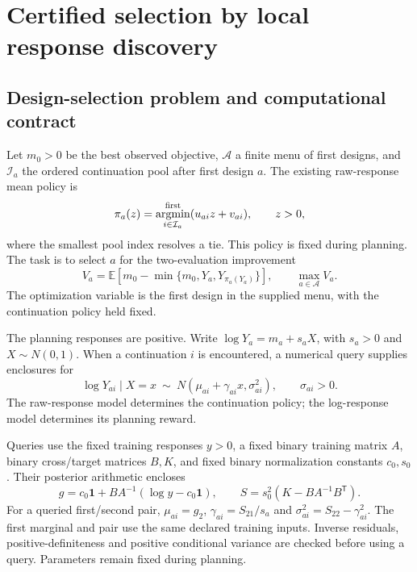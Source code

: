 \section{Certified selection by local response discovery}\label{sec:final_method}

\subsection{Design-selection problem and computational contract}

Let $m_0>0$ be the best observed objective, $\mathcal A$ a finite menu of first designs, and $\mathcal I_a$ the ordered continuation pool after first design $a$. The existing raw-response mean policy is
\begin{equation}
\pi_a(z)=\mathop{\rm argmin}^{\rm first}_{i\in\mathcal I_a}
                   (u_{ai}z+v_{ai}),\qquad z>0,
\label{eq:final_policy}
\end{equation}
where the smallest pool index resolves a tie. This policy is fixed during planning. The task is to select $a$ for the two-evaluation improvement
\begin{equation}
V_a=\mathbb E\left[m_0-\min\{m_0,Y_a,Y_{\pi_a(Y_a)}\}\right],
\qquad \max_{a\in\mathcal A}V_a.
\label{eq:final_objective}
\end{equation}
The optimization variable is the first design in the supplied menu, with the continuation policy held fixed.

The planning responses are positive. Write $\log Y_a=m_a+s_aX$, with $s_a>0$ and $X\sim N(0,1)$. When a continuation $i$ is encountered, a numerical query supplies enclosures for
\begin{equation}
\log Y_{ai}\mid X=x\ \sim\
N(\mu_{ai}+\gamma_{ai}x,\sigma_{ai}^2),\qquad \sigma_{ai}>0.
\label{eq:final_conditional_model}
\end{equation}
The raw-response model determines the continuation policy; the log-response model determines its planning reward.

Queries use the fixed training responses $y>0$, a fixed binary training matrix $A$, binary cross/target matrices $B,K$, and fixed binary normalization constants $c_0,s_0$. Their posterior arithmetic encloses
\begin{equation}
g=c_0\mathbf1+BA^{-1}(\log y-c_0\mathbf1),\qquad
S=s_0^2(K-BA^{-1}B^{\mathsf T}).
\label{eq:final_pair_posterior}
\end{equation}
For a queried first/second pair, $\mu_{ai}=g_2$, $\gamma_{ai}=S_{21}/s_a$ and $\sigma_{ai}^2=S_{22}-\gamma_{ai}^2$. The first marginal and pair use the same declared training inputs. Inverse residuals, positive-definiteness and positive conditional variance are checked before using a query. Parameters remain fixed during planning.

